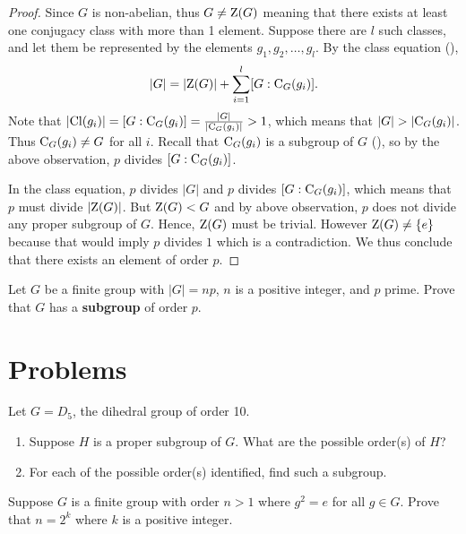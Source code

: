 \begin{proof}
    Since $G$ is non-abelian, thus $G \neq \mathrm{Z}(G)$ meaning that there exists at least one conjugacy class with more than 1 element. Suppose there are $l$ such classes, and let them be represented by the elements $g_1, g_2, \dots, g_l$. By the class equation (),
    \[
        |G| = |\mathrm{Z}(G)| + \sum_{i=1}^l [G:\mathrm{C}_{G}(g_i)].
    \]
    Note that $|\mathrm{Cl}(g_i)| = [G:\mathrm{C}_{G}(g_i)] = \frac{|G|}{|\mathrm{C}_{G}(g_i)|} > 1$, which means that $|G| > |\mathrm{C}_{G}(g_i)|$. Thus $\mathrm{C}_{G}(g_i) \neq G$ for all $i$. Recall that $\mathrm{C}_{G}(g_i)$ is a subgroup of $G$ (), so by the above observation, $p$ divides $[G:\mathrm{C}_{G}(g_i)]$.

    In the class equation, $p$ divides $|G|$ and $p$ divides $[G:\mathrm{C}_{G}(g_i)]$, which means that $p$ must divide $|\mathrm{Z}(G)|$. But $\mathrm{Z}(G) < G$ and by above observation, $p$ does not divide any proper subgroup of $G$. Hence, $\mathrm{Z}(G)$ must be trivial. However $\mathrm{Z}(G) \neq \{e\}$ because that would imply $p$ divides $1$ which is a contradiction. We thus conclude that there exists an element of order $p$.
\end{proof}

\begin{exercise}\label{exercise-group-of-order-multiple-of-prime-has-subgroup-of-prime-order}
    Let $G$ be a finite group with $|G| = np$, $n$ is a positive integer, and $p$ prime. Prove that $G$ has a \textbf{subgroup} of order $p$.
\end{exercise}

\newpage

\section{Problems}
\begin{problem}
    Let $G = D_5$, the dihedral group of order 10.
    \begin{enumerate}[label=(\alph*)]
        \item Suppose $H$ is a proper subgroup of $G$. What are the possible order(s) of $H$?
        \item For each of the possible order(s) identified, find such a subgroup.
    \end{enumerate}
\end{problem}

\begin{problem}
    Suppose $G$ is a finite group with order $n > 1$ where $g^2 = e$ for all $g \in G$. Prove that $n = 2^k$ where $k$ is a positive integer.
\end{problem}

